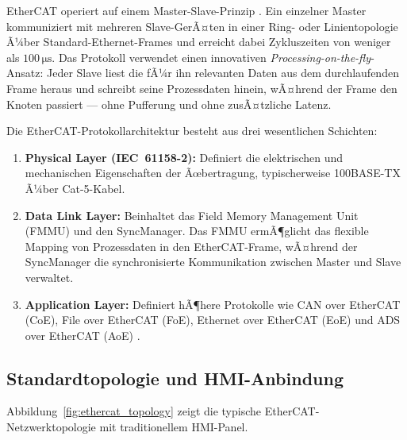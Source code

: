 ﻿\documentclass[12pt,a4paper]{article}
\begin{document}
EtherCAT operiert auf einem Master-Slave-Prinzip \cite{etg_spec}. Ein einzelner Master
kommuniziert mit mehreren Slave-GerÃ¤ten in einer Ring- oder Linientopologie Ã¼ber
Standard-Ethernet-Frames und erreicht dabei Zykluszeiten von weniger als
$100\,\si{\micro\second}$. Das Protokoll verwendet einen innovativen
\emph{Processing-on-the-fly}-Ansatz: Jeder Slave liest die fÃ¼r ihn relevanten Daten aus
dem durchlaufenden Frame heraus und schreibt seine Prozessdaten hinein, wÃ¤hrend der
Frame den Knoten passiert --- ohne Pufferung und ohne zusÃ¤tzliche Latenz.

Die EtherCAT-Protokollarchitektur besteht aus drei wesentlichen Schichten:

\begin{enumerate}[leftmargin=2em]
  \item \textbf{Physical Layer (IEC~61158-2):} Definiert die elektrischen und mechanischen
    Eigenschaften der Ãœbertragung, typischerweise 100BASE-TX Ã¼ber Cat-5-Kabel.
  \item \textbf{Data Link Layer:} Beinhaltet das Field Memory Management Unit (FMMU) und
    den SyncManager. Das FMMU ermÃ¶glicht das flexible Mapping von Prozessdaten in den
    EtherCAT-Frame, wÃ¤hrend der SyncManager die synchronisierte Kommunikation zwischen
    Master und Slave verwaltet.
  \item \textbf{Application Layer:} Definiert hÃ¶here Protokolle wie CAN over EtherCAT
    (CoE), File over EtherCAT (FoE), Ethernet over EtherCAT (EoE) und ADS over EtherCAT
    (AoE) \cite{iec61784}.
\end{enumerate}

\subsection{Standardtopologie und HMI-Anbindung}

Abbildung~\ref{fig:ethercat_topology} zeigt die typische EtherCAT-Netzwerktopologie mit
traditionellem HMI-Panel.
\end{document}
